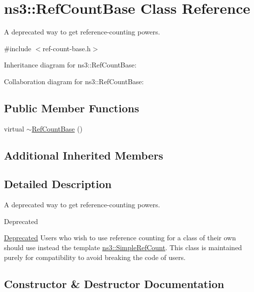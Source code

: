 \hypertarget{classns3_1_1RefCountBase}{}\section{ns3\+:\+:Ref\+Count\+Base Class Reference}
\label{classns3_1_1RefCountBase}


A deprecated way to get reference-\/counting powers.  




{\ttfamily \#include $<$ref-\/count-\/base.\+h$>$}



Inheritance diagram for ns3\+:\+:Ref\+Count\+Base\+:


Collaboration diagram for ns3\+:\+:Ref\+Count\+Base\+:
\subsection*{Public Member Functions}
\begin{DoxyCompactItemize}
\item 
virtual \hyperlink{classns3_1_1RefCountBase_a1782546360ed079b53a02696e85a2c90}{$\sim$\+Ref\+Count\+Base} ()
\end{DoxyCompactItemize}
\subsection*{Additional Inherited Members}


\subsection{Detailed Description}
A deprecated way to get reference-\/counting powers. 

\begin{DoxyRefDesc}{Deprecated}
\item[\hyperlink{deprecated__deprecated000003}{Deprecated}]Users who wish to use reference counting for a class of their own should use instead the template \hyperlink{classns3_1_1SimpleRefCount}{ns3\+::\+Simple\+Ref\+Count}. This class is maintained purely for compatibility to avoid breaking the code of users. \end{DoxyRefDesc}


\subsection{Constructor \& Destructor Documentation}
